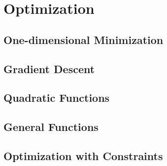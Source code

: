 \section{Optimization}
\label{section2.5}

\subsection{One-dimensional Minimization}

\subsection{Gradient Descent}

\subsection{Quadratic Functions}

\subsection{General Functions}

\subsection{Optimization with Constraints}
